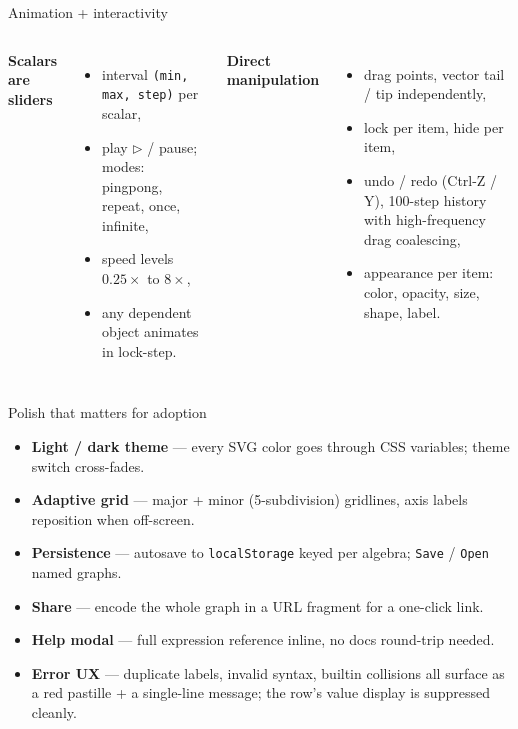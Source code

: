 \documentclass[aspectratio=169,11pt]{beamer}
\begin{document}
\begin{frame}{Animation + interactivity}
  \begin{columns}[T]
      \textbf{Scalars are sliders}
      \begin{itemize}
        \item interval \texttt{(min, max, step)} per scalar,
        \item play \(\triangleright\) / pause; modes: pingpong, repeat,
              once, infinite,
        \item speed levels \(0.25\!\times\) to \(8\!\times\),
        \item any dependent object animates in lock-step.
      \end{itemize}

      \textbf{Direct manipulation}
      \begin{itemize}
        \item drag points, vector tail / tip independently,
        \item lock per item, hide per item,
        \item undo / redo (Ctrl-Z / Y), 100-step history with
              high-frequency drag coalescing,
        \item appearance per item: color, opacity, size, shape, label.
      \end{itemize}
  \end{columns}
\end{frame}

\begin{frame}{Polish that matters for adoption}
  \begin{itemize}
    \item \textbf{Light / dark theme} — every SVG color goes through CSS
          variables; theme switch cross-fades.
    \item \textbf{Adaptive grid} — major + minor (5-subdivision) gridlines,
          axis labels reposition when off-screen.
    \item \textbf{Persistence} — autosave to \texttt{localStorage} keyed
          per algebra; \texttt{Save} / \texttt{Open} named graphs.
    \item \textbf{Share} — encode the whole graph in a URL fragment for
          a one-click link.
    \item \textbf{Help modal} — full expression reference inline, no
          docs round-trip needed.
    \item \textbf{Error UX} — duplicate labels, invalid syntax, builtin
          collisions all surface as a red pastille + a single-line
          message; the row's value display is suppressed cleanly.
  \end{itemize}
\end{frame}
\end{document}
